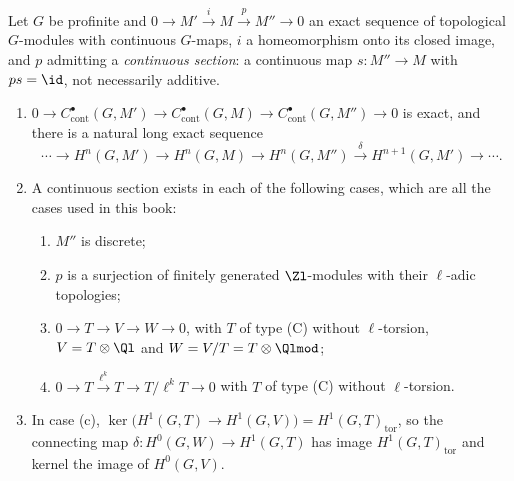 \begin{proposition}\label{prop:cohomology:les-cont}
Let $G$ be profinite and $0\to M'\xrightarrow{i}M\xrightarrow{p}M''\to0$ an exact sequence of topological $G$-modules with continuous $G$-maps, $i$ a
homeomorphism onto its closed image, and $p$ admitting a \emph{continuous section}: a continuous map $s\colon M''\to M$ with $ps=\id$, not necessarily additive.
\begin{enumerate}[label=(\roman*)]
\item $0\to C^\bullet_{\mathrm{cont}}(G,M')\to C^\bullet_{\mathrm{cont}}(G,M)\to C^\bullet_{\mathrm{cont}}(G,M'')\to0$ is exact, and there is a natural long exact sequence
\[
\cdots\to H^n(G,M')\to H^n(G,M)\to H^n(G,M'')\xrightarrow{\delta}H^{n+1}(G,M')\to\cdots.
\]
\item A continuous section exists in each of the following cases, which are all the cases used in this book:
\begin{enumerate}[label=(\alph*)]
\item $M''$ is discrete;
\item $p$ is a surjection of finitely generated $\Zl$-modules with their $\ell$-adic topologies;
\item $0\to T\to V\to W\to0$, with $T$ of type (C) without $\ell$-torsion, $V=T\otimes\Ql$ and $W=V/T=T\otimes\Qlmod$;
\item $0\to T\xrightarrow{\ell^k}T\to T/\ell^kT\to0$ with $T$ of type (C) without $\ell$-torsion.
\end{enumerate}
\item \sloppy In case (c), $\ker\bigl(H^1(G,T)\to H^1(G,V)\bigr)=H^1(G,T)_{\mathrm{tor}}$, so the connecting map $\delta\colon H^0(G,W)\to H^1(G,T)$ has image $H^1(G,T)_{\mathrm{tor}}$
and kernel the image of $H^0(G,V)$.
\end{enumerate}
\end{proposition}

